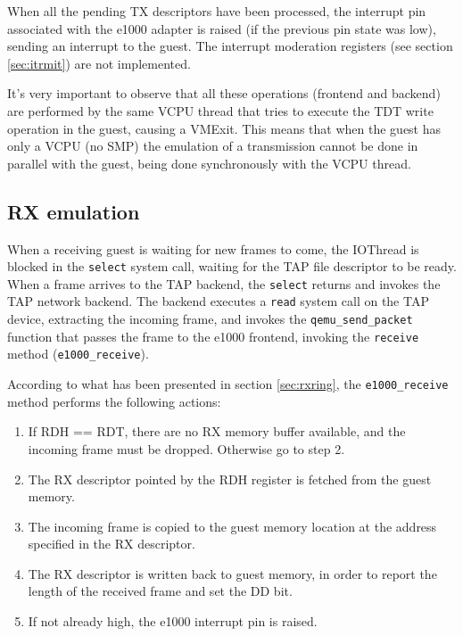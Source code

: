 When all the pending TX descriptors have been processed, the interrupt pin associated with the e1000 adapter is raised (if the previous
pin state was low), sending an interrupt to the guest. The interrupt moderation registers (see section \ref{sec:itrmit}) are not implemented.

\vspace{0.5cm}

It's very important to observe that all these operations (frontend and backend) are performed by the same VCPU thread that tries to 
execute the TDT write operation in the guest, causing a VMExit.
This means that when the guest has only a VCPU (no SMP) the emulation of a transmission cannot be done in parallel with the guest, being
done synchronously with the VCPU thread.



\subsection{RX emulation}
\label{sec:e1000rxemu}
When a receiving guest is waiting for new frames to come, the IOThread is blocked in the \texttt{select} system call, waiting for
the TAP file descriptor to be ready.
When a frame arrives to the TAP backend, the \texttt{select} returns and invokes the TAP network backend.
The backend executes a \texttt{read} system call on the TAP device, extracting the incoming frame, and invokes the
\texttt{qemu\_send\_packet} function that passes the frame to the e1000 frontend, invoking the \texttt{receive} method
(\texttt{e1000\_receive}).

\vspace{0.5cm}

According to what has been presented in section \ref{sec:rxring}, the \texttt{e1000\_receive} method performs the following actions:
\begin{enumerate}
    \item If RDH == RDT, there are no RX memory buffer available, and the incoming frame must be dropped. Otherwise go to step 2.
    \item The RX descriptor pointed by the RDH register is fetched from the guest memory.
    \item The incoming frame is copied to the guest memory location at the address specified in the RX descriptor.
    \item The RX descriptor is written back to guest memory, in order to report the length of the received frame and set the DD bit.
    \item If not already high, the e1000 interrupt pin is raised.
\end{enumerate}


